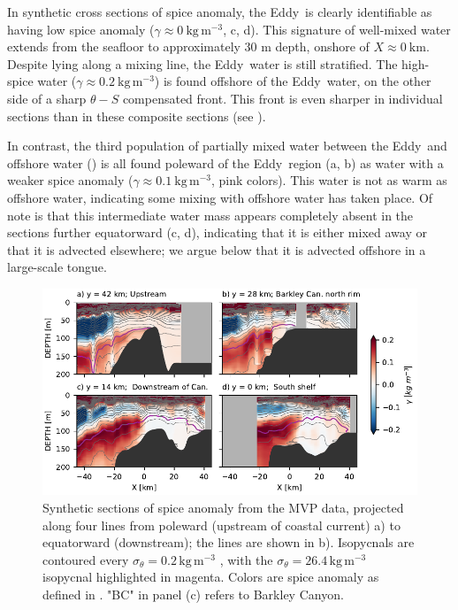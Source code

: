 \documentclass[draft]{agujournal2019}
\newcommand*{\Eddy}{{\sc Eddy}}
\begin{document}
In synthetic cross sections of spice anomaly, the \Eddy\ is clearly identifiable as having low spice anomaly ($\gamma \approx 0\ \mathrm{kg\,m^{-3}}$, c, d).  This signature of well-mixed water extends from the seafloor to approximately 30 m depth, onshore of $X \approx 0\ \mathrm{km}$.  Despite lying along a mixing line, the \Eddy\ water is still stratified.  The high-spice water ($\gamma \approx 0.2\ \mathrm{kg\,m^{-3}}$) is found offshore of the \Eddy\ water, on the other side of a sharp $\theta-S$ compensated front. This front is even sharper in individual sections than in these composite sections (see ).

In contrast, the third population of partially mixed water between the \Eddy\ and offshore water () is all found poleward of the \Eddy\ region (a, b) as water with a weaker spice anomaly ($\gamma \approx 0.1\ \mathrm{kg\,m^{-3}}$, pink colors).  This water is  not as warm as offshore water, indicating some mixing with offshore water has taken place.  Of note is that this intermediate water mass appears completely absent in the sections further equatorward (c, d), indicating that it is either mixed away or that it is advected elsewhere; we argue below that it is advected offshore in a large-scale tongue.

\begin{figure}[htbp]
  \begin{center}
    \includegraphics[width=6.2in]{CrossSectionsSpice}
    \caption{Synthetic sections of spice anomaly from the MVP data, projected along four lines from poleward (upstream of coastal current) a) to equatorward (downstream); the lines are shown in b).    Isopycnals are contoured every $\sigma_{\theta} = 0.2\,\mathrm{kg\,m^{-3}}$ , with the $\sigma_{\theta} = 26.4\,\mathrm{kg\,m^{-3}}$ isopycnal highlighted in magenta.  Colors are spice anomaly as defined in . "BC" in panel (c) refers to Barkley Canyon.
      \label{fig:CrossSectionsSpice} }
  \end{center}
\end{figure}
\end{document}
